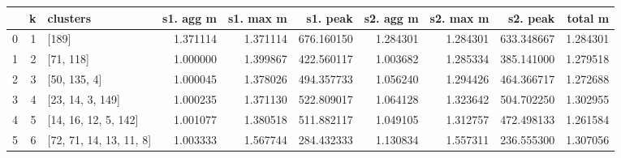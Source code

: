 \begin{tabular}{lrlrrrrrrr}
\toprule
{} &  k &                 clusters &  s1. agg m &  s1. max m &    s1. peak &  s2. agg m &  s2. max m &    s2. peak &   total m \\
\midrule
0 &  1 &                    [189] &   1.371114 &   1.371114 &  676.160150 &   1.284301 &   1.284301 &  633.348667 &  1.284301 \\
1 &  2 &                [71, 118] &   1.000000 &   1.399867 &  422.560117 &   1.003682 &   1.285334 &  385.141000 &  1.279518 \\
2 &  3 &             [50, 135, 4] &   1.000045 &   1.378026 &  494.357733 &   1.056240 &   1.294426 &  464.366717 &  1.272688 \\
3 &  4 &         [23, 14, 3, 149] &   1.000235 &   1.371130 &  522.809017 &   1.064128 &   1.323642 &  504.702250 &  1.302955 \\
4 &  5 &     [14, 16, 12, 5, 142] &   1.001077 &   1.380518 &  511.882117 &   1.049105 &   1.312757 &  472.498133 &  1.261584 \\
5 &  6 &  [72, 71, 14, 13, 11, 8] &   1.003333 &   1.567744 &  284.432333 &   1.130834 &   1.557311 &  236.555300 &  1.307056 \\
\bottomrule
\end{tabular}

